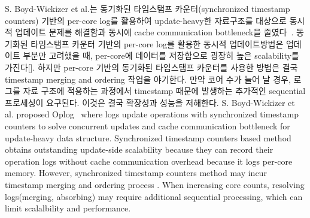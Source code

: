 \fi

\ifkor
S. Boyd-Wickizer et al.는 동기화된 타임스탬프 카운터(synchronized timestamp counters) 기반의
per-core log를 활용하여 update-heavy한 자료구조를 대상으로 동시적 업데이트 문제를
해결함과 동시에 cache communication bottleneck을 줄였다~\cite{SilasBoydWickizerPth}.
동기화된 타임스탬프 카운터 기반의 per-core log를 활용한 동시적 업데이트방법은
업데이트 부분만 고려했을 때, per-core에 데이터를 저장함으로 굉장히 높은 scalability를 가진다[].
하지만 per-core 기반의 동기화된 타임스탬프 카운터를 사용한 방법은 결국 timestamp merging and ordering 작업을
야기한다.
만약 코어 수가 늘어 날 경우, 로그를 자료 구조에 적용하는 과정에서 timestamp 때문에 발생하는 추가적인 sequential 프로세싱이
요구된다.
이것은 결국 확장성과 성능을 저해한다. 
\else
S. Boyd-Wickizer et al. proposed Oplog~\cite{SilasBoydWickizerPth} where logs
update operations with synchronized timestamp counters to solve concurrent
updates and cache communication bottleneck for update-heavy data structure.
Synchronized timestamp counters based method obtains outstanding
update-side scalability because they can record their operation logs without
cache communication overhead because it logs per-core memory.
However, synchronized timestamp counters method may incur timestamp merging and
ordering process .
When increasing core counts, resolving logs(merging, absorbing) may require
additional sequential processing, which can limit scalalbility and performance.
\fi



